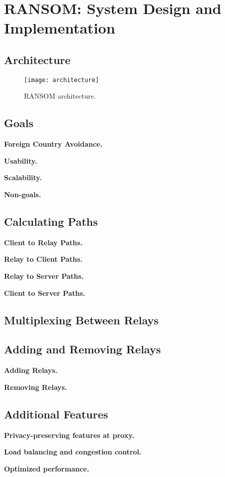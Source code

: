 \section{RANSOM: System Design and Implementation}

\subsection{Architecture}


\begin{figure}[t]
\centering
\texttt{[image: architecture]}
\caption{RANSOM architecture.}
\label{fig:arch}
\end{figure}

\subsection{Goals}

{\bf Foreign Country Avoidance.}

{\bf Usability.}

{\bf Scalability.}

{\bf Non-goals.}  

\subsection{Calculating Paths}

{\bf Client to Relay Paths.}

{\bf Relay to Client Paths.}

{\bf Relay to Server Paths.}

{\bf Client to Server Paths.}


\subsection{Multiplexing Between Relays}


\subsection{Adding and Removing Relays}

{\bf Adding Relays.}

{\bf Removing Relays.}

\subsection{Additional Features}

{\bf Privacy-preserving features at proxy.}

{\bf Load balancing and congestion control.}

{\bf Optimized performance.}
